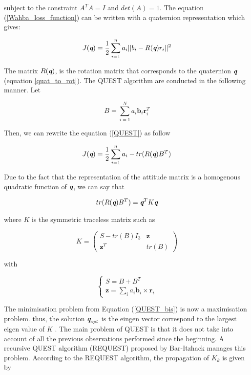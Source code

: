 \documentclass[conference]{IEEEtran}
\begin{document}
subject to the constraint $A^TA = I$ and $det(A)=1$. The equation (\ref{Wahba_loss_function}) can be written with a quaternion representation which gives:

\begin{equation}
J(\mathbi{q}) = \frac{1}{2} \sum_{i=1}^n a_i||b_i-R(\mathbi{q})r_i||^2
\label{QUEST}
\end{equation}

The matrix $R(\textbf{\em q})$, is the rotation matrix that corresponds to the quaternion $\textbf{\em q}$ (equation \ref{quat_to_rot}). The QUEST algorithm are conducted in the following manner. Let

\begin{equation}
B = \sum_{i=1}^N a_i\textbf{b}_i \textbf{r}_i^T
\end{equation}

Then, we can rewrite the equation (\ref{QUEST}) as follow

\begin{equation}
J(\mathbi{q}) = \frac{1}{2} \sum_{i=1}^n a_i  - tr(R(\mathbi{q})B^T)
\label{QUEST_bis}
\end{equation}

Due to the fact that the representation of the attitude matrix is a homogenous quadratic function of $\textbf{\em q}$, we can say that

\begin{equation}
tr(R(\mathbi{q})B^T) = \mathbi{q}^TK\mathbi{q}
\label{QUEST_ter}
\end{equation}

where $K$ is the symmetric traceless matrix such as

\begin{equation}
K = \begin{pmatrix} S-tr(B)I_3 & \textbf{z} \\ \textbf{z}^T & tr(B)
\end{pmatrix}
\end{equation}

with

\begin{equation}
\left\{\begin{array}{l}
S = B + B^T\\
\textbf{z} = \sum_ia_i\textbf{b}_i\times\textbf{r}_i
 \end{array}
\right.
\end{equation}


The minimisation problem from Equation (\ref{QUEST_bis}) is now a maximisation problem. thus, the solution $\textbf{\em q}_{opt}$ is the eingen vector correspond to the largest eigen value of $K$ \cite{markley1999estimate}. The main problem of QUEST is that it does not take into account of all the previous observations performed since the beginning. A recursive QUEST algorithm (REQUEST) proposed by Bar-Itzhack manages this problem. According to the REQUEST algorithm, the propagation of $K_k$ is given by
\end{document}
